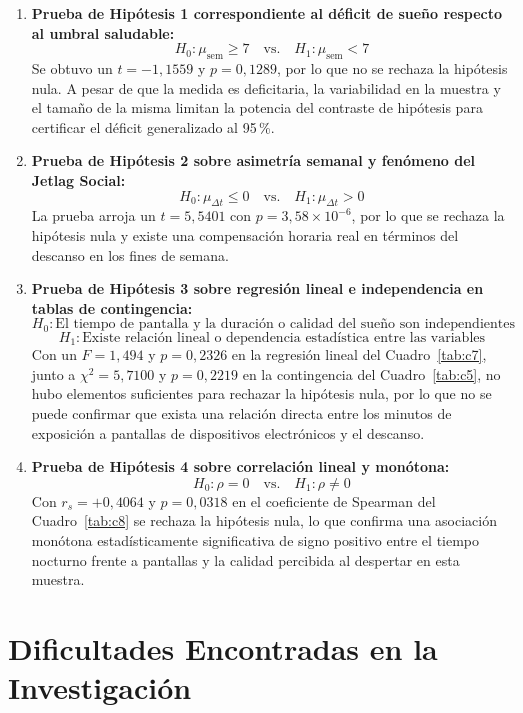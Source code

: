 \documentclass[12pt, letterpaper]{article}
\begin{document}
\begin{enumerate}
    \item \textbf{Prueba de Hipótesis 1 correspondiente al déficit de sueño respecto al umbral saludable:}
    $$H_0: \mu_{\text{sem}} \ge 7 \quad \text{vs.} \quad H_1: \mu_{\text{sem}} < 7$$
    Se obtuvo un $t = -1{,}1559$ y $p = 0{,}1289$, por lo que no se rechaza la hipótesis nula. A pesar de que la medida es deficitaria, la variabilidad en la muestra y el tamaño de la misma limitan la potencia del contraste de hipótesis para certificar el déficit generalizado al 95\,\%.

    \item \textbf{Prueba de Hipótesis 2 sobre asimetría semanal y fenómeno del Jetlag Social:}
    $$H_0: \mu_{\Delta t} \le 0 \quad \text{vs.} \quad H_1: \mu_{\Delta t} > 0$$
    La prueba arroja un $t = 5{,}5401$ con $p = 3{,}58 \times 10^{-6}$, por lo que se rechaza la hipótesis nula y existe una compensación horaria real en términos del descanso en los fines de semana.

    \item \textbf{Prueba de Hipótesis 3 sobre regresión lineal e independencia en tablas de contingencia:}
    $$H_0: \text{El tiempo de pantalla y la duración o calidad del sueño son independientes}$$
    $$H_1: \text{Existe relación lineal o dependencia estadística entre las variables}$$
    Con un $F = 1{,}494$ y $p = 0{,}2326$ en la regresión lineal del Cuadro~\ref{tab:c7}, junto a $\chi^2 = 5{,}7100$ y $p = 0{,}2219$ en la contingencia del Cuadro~\ref{tab:c5}, no hubo elementos suficientes para rechazar la hipótesis nula, por lo que no se puede confirmar que exista una relación directa entre los minutos de exposición a pantallas de dispositivos electrónicos y el descanso.

    \item \textbf{Prueba de Hipótesis 4 sobre correlación lineal y monótona:}
    $$H_0: \rho = 0 \quad \text{vs.} \quad H_1: \rho \neq 0$$
    Con $r_s = +0{,}4064$ y $p = 0{,}0318$ en el coeficiente de Spearman del Cuadro~\ref{tab:c8} se rechaza la hipótesis nula, lo que confirma una asociación monótona estadísticamente significativa de signo positivo entre el tiempo nocturno frente a pantallas y la calidad percibida al despertar en esta muestra.
\end{enumerate}


\section{Dificultades Encontradas en la Investigación}
\end{document}
